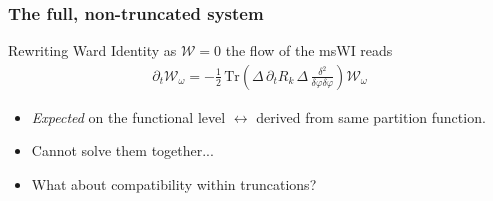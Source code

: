 \documentclass[]{beamer}  %
\begin{document}
\begin{frame}[t]
  \frametitle{The full, non-truncated system}

  \vspace{25pt}

  \begin{center}
  \end{center}

  \vspace{25pt}
  Rewriting Ward Identity as $\mathcal{W}=0$ the flow of the msWI reads
  \begin{align*}
    \boxed{
      \partial_t \mathcal{W}_{\omega}=-\frac{1}{2} \, \text{Tr}
      \left(
        \Delta \, \partial_t R_k \, \Delta \, \frac{\delta^2}{\delta\varphi\delta\varphi}
      \right)
      \mathcal{W}_{\omega}
    }
  \end{align*}

  \vspace{15pt}
  \begin{itemize}
    \item \textit{Expected} on the functional level $\leftrightarrow$ derived from same partition function.
    \item Cannot solve them together...
    \item What about compatibility within truncations?
  \end{itemize}
\end{frame}


\end{document}
